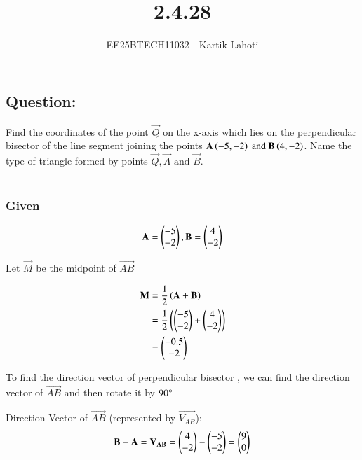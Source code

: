 \documentclass[journal]{IEEEtran}
\numberwithin{equation}{enumi}
\numberwithin{figure}{enumi}
\begin{document}

\vspace{3cm}

\title{2.4.28}
\author{EE25BTECH11032 - Kartik Lahoti}
\maketitle

\subsection*{Question: } 
Find the coordinates of the point $\vec{Q}$ on the x-axis which lies on the perpendicular bisector of the line segment joining the points $\mathbf{A} \left(-5,-2\right) \text{ and } \mathbf{B} \left(4,-2\right)$. Name the type of triangle formed by points $\vec{Q}, \vec{A} \text{ and } \vec{B}$.\\
\solution \\ 

\subsubsection*{Given }
\begin{align}
    \mathbf{A} = \begin{pmatrix}-5\\-2\end{pmatrix} , \mathbf{B} = \begin{pmatrix}4\\-2\end{pmatrix}      
\end{align}

Let $\vec{M}$ be the midpoint of $\vec{AB}$

\begin{align}
    \mathbf{M} &= \frac{1}{2}\left(\mathbf{A} + \mathbf{B}\right)\\
     &= \frac{1}{2}\left(\begin{pmatrix}-5\\-2\end{pmatrix} + \begin{pmatrix}4\\-2\end{pmatrix}\right)\\
     &= \begin{pmatrix}-0.5 \\ -2\end{pmatrix}
\end{align}

To find the direction vector of perpendicular bisector , we can find the direction vector of $\vec{AB}$ and then rotate it by $90\degree$

Direction Vector of $\vec{AB}$ (represented by $\vec{V_{AB}}$): 
\begin{align}
    \mathbf{B} - \mathbf{A} = \mathbf{V_{AB}} = \begin{pmatrix}4\\-2\end{pmatrix} - \begin{pmatrix}-5\\-2\end{pmatrix} = \begin{pmatrix}9 \\ 0 \end{pmatrix}
\end{align}
\end{document}
